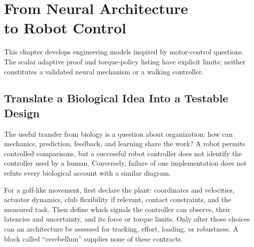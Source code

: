 \chapter[Neural Architecture and Robot Control]{From Neural Architecture\\to Robot Control}
\label{ch:neural-to-robot}

\begin{gomdraftnotice}
This chapter develops engineering models inspired by motor-control questions.
The scalar adaptive proof and torque-policy listing have explicit limits;
neither constitutes a validated neural mechanism or a walking controller.
\end{gomdraftnotice}

\section{Translate a Biological Idea Into a Testable Design}

The useful transfer from biology is a question about organization: how can
mechanics, prediction, feedback, and learning share the work? A robot permits
controlled comparisons, but a successful robot controller does not identify
the controller used by a human. Conversely, failure of one implementation does
not refute every biological account with a similar diagram.

For a golf-like movement, first declare the plant: coordinates and velocities,
actuator dynamics, club flexibility if relevant, contact constraints, and the
measured task. Then define which signals the controller can observe, their
latencies and uncertainty, and its force or torque limits. Only after those
choices can an architecture be assessed for tracking, effort, loading, or
robustness. A block called ``cerebellum'' supplies none of these contracts.

